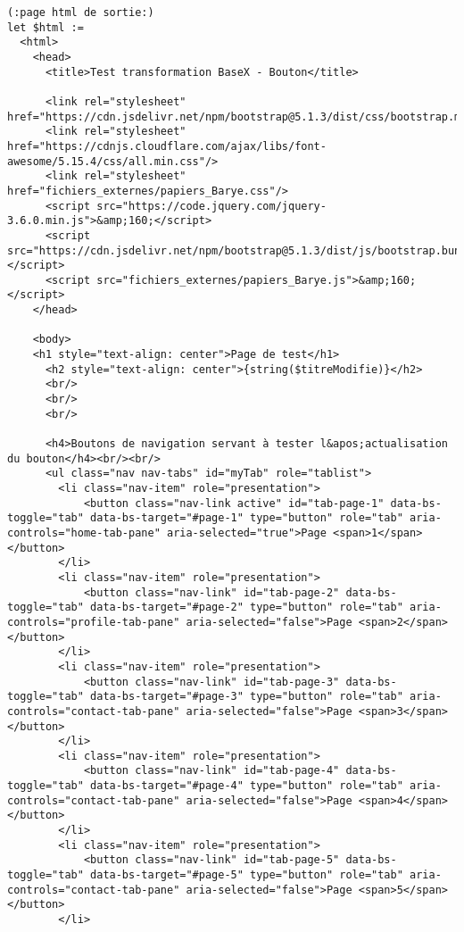 \begin{verbatim}
(:page html de sortie:)
let $html :=
  <html>
    <head>
      <title>Test transformation BaseX - Bouton</title>
         
      <link rel="stylesheet" href="https://cdn.jsdelivr.net/npm/bootstrap@5.1.3/dist/css/bootstrap.min.css"/> 
      <link rel="stylesheet" href="https://cdnjs.cloudflare.com/ajax/libs/font-awesome/5.15.4/css/all.min.css"/>
      <link rel="stylesheet" href="fichiers_externes/papiers_Barye.css"/>          
      <script src="https://code.jquery.com/jquery-3.6.0.min.js">&amp;160;</script>  
      <script src="https://cdn.jsdelivr.net/npm/bootstrap@5.1.3/dist/js/bootstrap.bundle.min.js">&amp;160;</script>         
      <script src="fichiers_externes/papiers_Barye.js">&amp;160;</script>     
    </head>
    
    <body>
    <h1 style="text-align: center">Page de test</h1>
      <h2 style="text-align: center">{string($titreModifie)}</h2>
      <br/>
      <br/>
      <br/>
      
      <h4>Boutons de navigation servant à tester l&apos;actualisation du bouton</h4><br/><br/>
      <ul class="nav nav-tabs" id="myTab" role="tablist">
        <li class="nav-item" role="presentation">
            <button class="nav-link active" id="tab-page-1" data-bs-toggle="tab" data-bs-target="#page-1" type="button" role="tab" aria-controls="home-tab-pane" aria-selected="true">Page <span>1</span></button>
        </li>
        <li class="nav-item" role="presentation">
            <button class="nav-link" id="tab-page-2" data-bs-toggle="tab" data-bs-target="#page-2" type="button" role="tab" aria-controls="profile-tab-pane" aria-selected="false">Page <span>2</span></button>
        </li>
        <li class="nav-item" role="presentation">
            <button class="nav-link" id="tab-page-3" data-bs-toggle="tab" data-bs-target="#page-3" type="button" role="tab" aria-controls="contact-tab-pane" aria-selected="false">Page <span>3</span></button>
        </li>        
        <li class="nav-item" role="presentation">
            <button class="nav-link" id="tab-page-4" data-bs-toggle="tab" data-bs-target="#page-4" type="button" role="tab" aria-controls="contact-tab-pane" aria-selected="false">Page <span>4</span></button>
        </li>
        <li class="nav-item" role="presentation">
            <button class="nav-link" id="tab-page-5" data-bs-toggle="tab" data-bs-target="#page-5" type="button" role="tab" aria-controls="contact-tab-pane" aria-selected="false">Page <span>5</span></button>
        </li> 


\end{verbatim}
